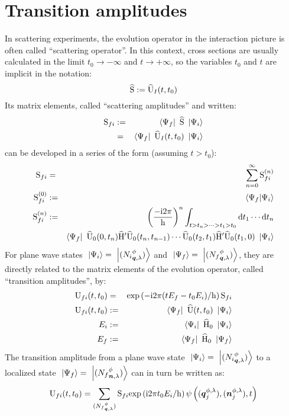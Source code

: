 \section{Transition amplitudes}

In scattering experiments, the evolution operator in the interaction picture is often called ``scattering operator''.
In this context, cross sections are usually calculated in the limit $t_0 \to - \infty$ and $t \to + \infty$, so the variables $t_0$ and $t$ are implicit in the notation:
\begin{equation*}
\Sop \eqdef \UopI t {t_0}
\end{equation*}
Its matrix elements, called ``scattering amplitudes'' and written:
\begin{eqnarray*}
\Sm f i & \eqdef & \bra{\Psi_f} \Sop \ket{\Psi_i} \\
& = & \bra{\Psi_f} \UopI t {t_0} \ket{\Psi_i}
\end{eqnarray*}
can be developed in a series of the form (assuming $t > t_0$):
\begin{eqnarray*}
\Sm f i & = & \sum_{n=0}^\infty \Smn f i n \\
\Smn f i 0 & \eqdef & \braket{\Psi_f}{\Psi_i} \\
\Smn f i n & \eqdef & \left( \frac{-\i 2 \pi} \h \right)^n \int_{t > t_n > \dotsb > t_1 > t_0} \dt_1 \dotsm \dt_n \\
&& \bra{\Psi_f} \UopK 0 {t_n} \Hop' \UopK {t_n} {t_{n-1}} \dotsm \UopK {t_2} {t_1} \Hop' \UopK {t_1} 0 \ket{\Psi_i}
\end{eqnarray*}
For plane wave states $\ket{\Psi_i} = \ket{\bFQ {N_i} \pt \q \sp}$ and $\ket{\Psi_f} = \ket{\bFQ {N_f} \pt \q \sp}$, they are directly related to the matrix elements of the evolution operator, called ``transition amplitudes'', by:
\begin{eqnarray*}
\Um f i t {t_0} & = & \exp{-\i 2 \pi ( t E_f - t_0 E_i ) / \h} \Sm f i \\
\Um f i t {t_0} & \eqdef & \bra{\Psi_f} \Uop t {t_0} \ket{\Psi_i} \\
E_i & \eqdef & \bra{\Psi_i} \Hop_0 \ket{\Psi_i} \\
E_f & \eqdef & \bra{\Psi_f} \Hop_0 \ket{\Psi_f}
\end{eqnarray*}
The transition amplitude from a plane wave state $\ket{\Psi_i} = \ket{\bFQ {N_i} \pt \q \sp}$ to a localized state $\ket{\Psi_f} = \ket{\bFX {N_f} \pt \n \sp}$ can in turn be written as:
\begin{equation*}
\Um f i t {t_0} = \sum_{\bFQ {N_f} \pt \q \sp} \Sm f i \exp{\i 2 \pi t_0 E_i / \h} \psi \left( ( \q^{\pt, \sp}_j ), ( \n^{\pt, \sp}_j ), t \right)
\end{equation*}
